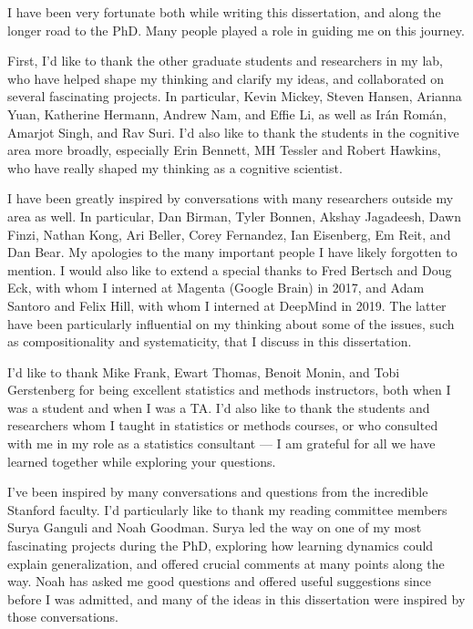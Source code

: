 \documentclass{report}
\begin{document}

I have been very fortunate both while writing this dissertation, and along the longer road to the PhD. Many people played a role in guiding me on this journey.

First, I'd like to thank the other graduate students and researchers in my lab, who have helped shape my thinking and clarify my ideas, and collaborated on several fascinating projects. In particular, Kevin Mickey, Steven Hansen, Arianna Yuan, Katherine Hermann, Andrew Nam, and Effie Li, as well as Ir\'an Rom\'an, Amarjot Singh, and Rav Suri. I'd also like to thank the students in the cognitive area more broadly, especially Erin Bennett, MH Tessler and Robert Hawkins, who have really shaped my thinking as a cognitive scientist. 

I have been greatly inspired by conversations with many researchers outside my area as well. In particular, Dan Birman, Tyler Bonnen, Akshay Jagadeesh, Dawn Finzi, Nathan Kong, Ari Beller, Corey Fernandez, Ian Eisenberg, Em Reit, and Dan Bear. My apologies to the many important people I have likely forgotten to mention. I would also like to extend a special thanks to Fred Bertsch and Doug Eck, with whom I interned at Magenta (Google Brain) in 2017, and Adam Santoro and Felix Hill, with whom I interned at DeepMind in 2019. The latter have been particularly influential on my thinking about some of the issues, such as compositionality and systematicity, that I discuss in this dissertation. 

I'd like to thank Mike Frank, Ewart Thomas, Benoit Monin, and Tobi Gerstenberg for being excellent statistics and methods instructors, both when I was a student and when I was a TA. I'd also like to thank the students and researchers whom I taught in statistics or methods courses, or who consulted with me in my role as a statistics consultant --- I am grateful for all we have learned together while exploring your questions.

I've been inspired by many conversations and questions from the incredible Stanford faculty. I'd particularly like to thank my reading committee members Surya Ganguli and Noah Goodman. Surya led the way on one of my most fascinating projects during the PhD, exploring how learning dynamics could explain generalization, and offered crucial comments at many points along the way. Noah has asked me good questions and offered useful suggestions since before I was admitted, and many of the ideas in this dissertation were inspired by those conversations. 
\end{document}

